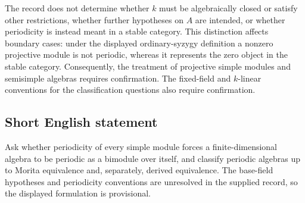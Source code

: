 \documentclass[11pt]{article}
\begin{document}
The record does not determine whether \(k\) must be algebraically closed or satisfy other restrictions, whether further hypotheses on \(A\) are intended, or whether periodicity is instead meant in a stable category. This distinction affects boundary cases: under the displayed ordinary-syzygy definition a nonzero projective module is not periodic, whereas it represents the zero object in the stable category. Consequently, the treatment of projective simple modules and semisimple algebras requires confirmation. The fixed-field and \(k\)-linear conventions for the classification questions also require confirmation.
\subsection{Short English statement}
Ask whether periodicity of every simple module forces a finite-dimensional algebra to be periodic as a bimodule over itself, and classify periodic algebras up to Morita equivalence and, separately, derived equivalence. The base-field hypotheses and periodicity conventions are unresolved in the supplied record, so the displayed formulation is provisional.
\end{document}
